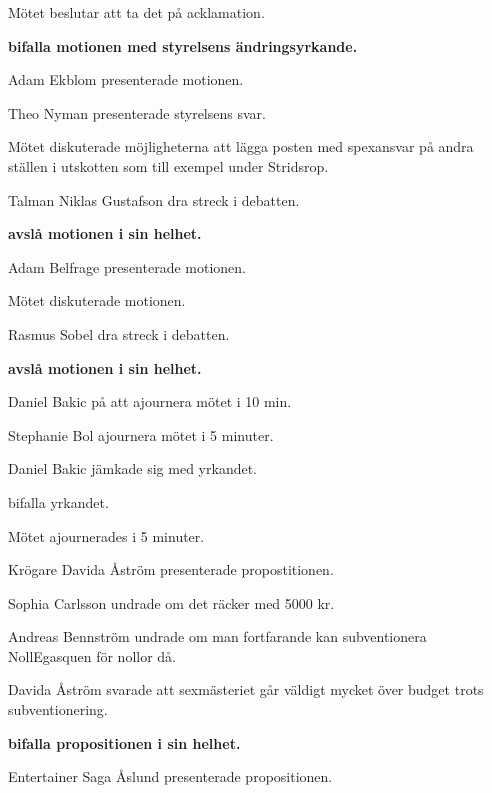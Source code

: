 \documentclass[10pt]{article}
\begin{document}
\begin{paragrafer}
\begin{paragrafer}
    Mötet beslutar att ta det på acklamation.

    \textbf{\Mba bifalla motionen med styrelsens ändringsyrkande.}

    Adam Ekblom presenterade motionen.

    Theo Nyman presenterade styrelsens svar. 

    Mötet diskuterade möjligheterna att lägga posten med spexansvar på andra ställen i utskotten som 
        till exempel under Stridsrop. 
    
    Talman Niklas Gustafson \ypa dra streck i debatten. 

    \textbf{\Mba avslå motionen i sin helhet. }

    Adam Belfrage presenterade motionen.

    Mötet diskuterade motionen.

    Rasmus Sobel \ypa dra streck i debatten.

    \Mbaby

    \textbf{\Mba avslå motionen i sin helhet.}

    Daniel Bakic \ypa på att ajournera mötet i 10 min.

    Stephanie Bol \ypa ajournera mötet i 5 minuter.

    Daniel Bakic jämkade sig med yrkandet.

    \Mba bifalla yrkandet.

    Mötet ajournerades i 5 minuter.

\end{paragrafer}
    \begin{paragrafer}
      Krögare Davida Åström presenterade propostitionen.

      Sophia Carlsson undrade om det räcker med 5000 kr.

      Andreas Bennström undrade om man fortfarande kan subventionera NollEgasquen för nollor då.

      Davida Åström svarade att sexmästeriet går väldigt mycket över budget trots subventionering.

      \textbf{\Mba bifalla propositionen i sin helhet.}

      Entertainer Saga Åslund presenterade propositionen.


\end{paragrafer}
\end{paragrafer}
\end{document}
